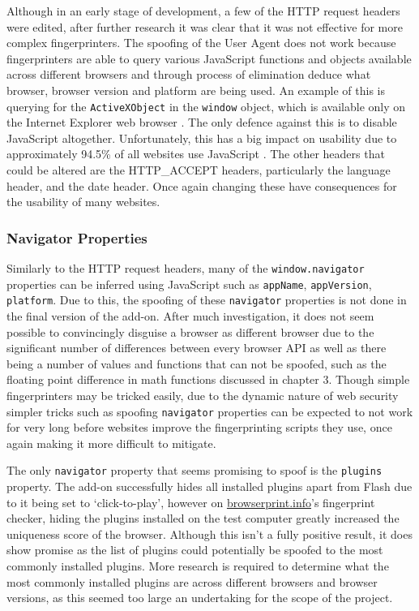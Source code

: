 Although in an early stage of development, a few of the HTTP request headers were edited, after further research it was clear that it was not effective for more complex fingerprinters.
The spoofing of the User Agent does not work because fingerprinters are able to query various JavaScript functions and objects available across different browsers and through process of elimination deduce what browser, browser version and platform are being used.
An example of this is querying for the \texttt{ActiveXObject} in the \texttt{window} object, which is available only on the Internet Explorer web browser \citep{activeX}.
The only defence against this is to disable JavaScript altogether.
Unfortunately, this has a big impact on usability due to approximately 94.5\% of all websites use JavaScript \citep{w3-javascript}.
The other headers that could be altered are the HTTP\_ACCEPT headers, particularly the language header, and the date header.
Once again changing these have consequences for the usability of many websites.

\subsubsection{Navigator Properties}

Similarly to the HTTP request headers, many of the \texttt{window.navigator} properties can be inferred using JavaScript such as \texttt{appName}, \texttt{appVersion}, \texttt{platform}.
Due to this, the spoofing of these \texttt{navigator} properties is not done in the final version of the add-on.
After much investigation, it does not seem possible to convincingly disguise a browser as different browser due to the significant number of differences between every browser API as well as there being a number of values and functions that can not be spoofed, such as the floating point difference in math functions discussed in chapter 3.
Though simple fingerprinters may be tricked easily, due to the dynamic nature of web security simpler tricks such as spoofing \texttt{navigator} properties can be expected to not work for very long before websites improve the fingerprinting scripts they use, once again making it more difficult to mitigate.

The only \texttt{navigator} property that seems promising to spoof is the \texttt{plugins} property.
The add-on successfully hides all installed plugins apart from Flash due to it being set to `click-to-play', however on \url{browserprint.info}'s fingerprint checker, hiding the plugins installed on the test computer greatly increased the uniqueness score of the browser.
Although this isn't a fully positive result, it does show promise as the list of plugins could potentially be spoofed to the most commonly installed plugins.
More research is required to determine what the most commonly installed plugins are across different browsers and browser versions, as this seemed too large an undertaking for the scope of the project.

